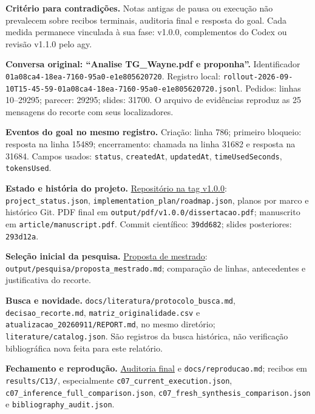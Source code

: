 \documentclass[11pt,a4paper]{article}
\begin{document}
\textbf{Critério para contradições.} Notas antigas de pausa ou execução não prevalecem sobre recibos terminais, auditoria final e resposta do goal. Cada medida permanece vinculada à sua fase: v1.0.0, complementos do Codex ou revisão v1.1.0 pelo agy.

{\footnotesize
\begin{enumerate}[label={\textbf{[\arabic*]}},leftmargin=2em,itemsep=5pt]
\item \textbf{Conversa original: ``Analise TG\_Wayne.pdf e proponha''.} Identificador \nolinkurl{01a08ca4-18ea-7160-95a0-e1e805620720}. Registro local: \nolinkurl{rollout-2026-09-10T15-45-59-}\allowbreak\nolinkurl{01a08ca4-18ea-7160-95a0-e1e805620720.jsonl}. Pedidos: linhas 10--29295; parecer: 29295; slides: 31700. O arquivo de evidências reproduz as 25 mensagens do recorte com seus localizadores.
\item \textbf{Eventos do goal no mesmo registro.} Criação: linha 786; primeiro bloqueio: resposta na linha 15489; encerramento: chamada na linha 31682 e resposta na 31684. Campos usados: \nolinkurl{status}, \nolinkurl{createdAt}, \nolinkurl{updatedAt}, \nolinkurl{timeUsedSeconds}, \nolinkurl{tokensUsed}.
\item \textbf{Estado e história do projeto.} \href{https://github.com/flavioluiz/TGdoWayne/tree/v1.0.0}{Repositório na tag v1.0.0}: \nolinkurl{project_status.json}, \nolinkurl{implementation_plan/roadmap.json}, planos por marco e histórico Git. PDF final em \nolinkurl{output/pdf/v1.0.0/dissertacao.pdf}; manuscrito em \nolinkurl{article/manuscript.pdf}. Commit científico: \nolinkurl{39dd682}; slides posteriores: \nolinkurl{293d12a}.
\item \textbf{Seleção inicial da pesquisa.} \href{https://github.com/flavioluiz/TGdoWayne/blob/v1.0.0/output/pesquisa/proposta_mestrado.md}{Proposta de mestrado}: \nolinkurl{output/pesquisa/proposta_mestrado.md}; comparação de linhas, antecedentes e justificativa do recorte.
\item \textbf{Busca e novidade.} \nolinkurl{docs/literatura/protocolo_busca.md}, \nolinkurl{decisao_recorte.md}, \nolinkurl{matriz_originalidade.csv} e \nolinkurl{atualizacao_20260911/REPORT.md}, no mesmo diretório; \nolinkurl{literature/catalog.json}. São registros da busca histórica, não verificação bibliográfica nova feita para este relatório.
\item \textbf{Fechamento e reprodução.} \href{https://github.com/flavioluiz/TGdoWayne/blob/v1.0.0/docs/auditoria_final.md}{Auditoria final} e \nolinkurl{docs/reproducao.md}; recibos em \nolinkurl{results/C13/}, especialmente \nolinkurl{c07_current_execution.json}, \nolinkurl{c07_inference_full_comparison.json}, \nolinkurl{c07_fresh_synthesis_comparison.json} e \nolinkurl{bibliography_audit.json}.

\end{enumerate}}
\end{document}
